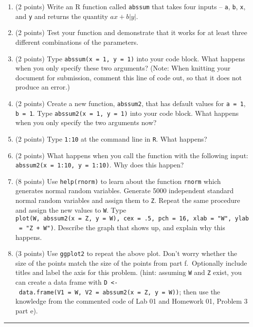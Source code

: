 \documentclass[]{article}
\begin{document}
\begin{enumerate}
\def\labelenumi{\alph{enumi}.}
\item
  (2 points) Write an R function called \texttt{abssum} that takes four
  inputs -- \texttt{a}, \texttt{b}, \texttt{x}, and \texttt{y} and
  returns the quantity \(ax + b|y|\).
\item
  (2 points) Test your function and demonstrate that it works for at
  least three different combinations of the parameters.
\item
  (2 points) Type \texttt{abssum(x\ =\ 1,\ y\ =\ 1)} into your code
  block. What happens when you only specify these two arguments? (Note:
  When knitting your document for submission, comment this line of code
  out, so that it does not produce an error.)
\item
  (2 points) Create a new function, \texttt{abssum2}, that has default
  values for \texttt{a\ =\ 1}, \texttt{b\ =\ 1}. Type
  \texttt{abssum2(x\ =\ 1,\ y\ =\ 1)} into your code block. What happens
  when you only specify the two arguments now?
\item
  (2 points) Type \texttt{1:10} at the command line in \texttt{R}. What
  happens?
\item
  (2 points) What happens when you call the function with the following
  input: \texttt{abssum2(x\ =\ 1:10,\ y\ =\ 1:10)}. Why does this
  happen?
\item
  (8 points) Use \texttt{help(rnorm)} to learn about the function
  \texttt{rnorm} which generates normal random variables. Generate 5000
  independent standard normal random variables and assign them to
  \texttt{Z}. Repeat the same procedure and assign the new values to
  \texttt{W}. Type
  \texttt{plot(W,\ abssum2(x\ =\ Z,\ y\ =\ W),\ cex\ =\ .5,\ pch\ =\ 16,\ xlab\ =\ "W",\ ylab\ =\ "Z\ +\ \textbar{}W\textbar{}")}.
  Describe the graph that shows up, and explain why this happens.
\item
  (3 points) Use \texttt{ggplot2} to repeat the above plot. Don't worry
  whether the size of the points match the size of the points from part
  f.~Optionally include titles and label the axis for this problem.
  (hint: assuming \texttt{W} and \texttt{Z} exist, you can create a data
  frame with
  \texttt{D\ \textless{}-\ data.frame(V1\ =\ W,\ V2\ =\ abssum2(x\ =\ Z,\ y\ =\ W))};
  then use the knowledge from the commented code of Lab 01 and Homework
  01, Problem 3 part e).
\end{enumerate}

\begin{center}\rule{0.5\linewidth}{\linethickness}\end{center}
\end{document}

